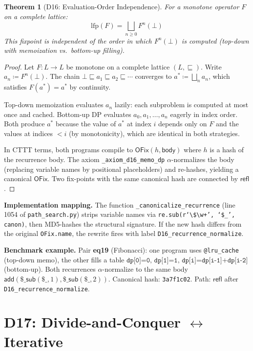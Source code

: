 \documentclass[11pt,a4paper]{report}
\theoremstyle{definition}
\theoremstyle{plain}
\newtheorem{theorem}[definition]{Theorem}
\begin{document}
\begin{theorem}[D16: Evaluation-Order Independence]
\label{thm:d16-lfp}
For a monotone operator $F$ on a complete lattice:
\[
  \mathrm{lfp}(F) = \bigsqcup_{n \geq 0} F^n(\bot)
\]
This fixpoint is independent of the order in which $F^n(\bot)$ is
computed (top-down with memoization vs.\ bottom-up filling).
\end{theorem}

\begin{proof}
Let $F : L \to L$ be monotone on a complete lattice $(L, \sqsubseteq)$.
Write $a_n \coloneqq F^n(\bot)$.  The chain
$\bot \sqsubseteq a_1 \sqsubseteq a_2 \sqsubseteq \cdots$ converges
to $a^* \coloneqq \bigsqcup_n a_n$, which satisfies $F(a^*) = a^*$
by continuity.

Top-down memoization evaluates $a_n$ lazily: each subproblem is
computed at most once and cached.  Bottom-up DP evaluates $a_0, a_1,
\ldots, a_n$ eagerly in index order.  Both produce $a^*$ because the
value of $a^*$ at index $i$ depends only on $F$ and the values at
indices $< i$ (by monotonicity), which are identical in both strategies.

In CTTT terms, both programs compile to $\mathsf{OFix}(h, \mathsf{body})$
where $h$ is a hash of the recurrence body.  The axiom
\texttt{\_axiom\_d16\_memo\_dp} $\alpha$-normalizes the body (replacing
variable names by positional placeholders) and re-hashes, yielding a
canonical $\mathsf{OFix}$.  Two fix-points with the same canonical
hash are connected by $\mathsf{refl}$.
\end{proof}

\textbf{Implementation mapping.}
The function \texttt{\_canonicalize\_recurrence} (line 1054 of
\texttt{path\_search.py}) strips variable names via
\texttt{re.sub(r`\textbackslash\$\textbackslash w+', `\$\_', canon)},
then MD5-hashes the structural signature.  If the new hash differs
from the original \texttt{OFix.name}, the rewrite fires with label
\texttt{D16\_recurrence\_normalize}.

\textbf{Benchmark example.}
Pair \textbf{eq19} (Fibonacci): one program uses
\texttt{@lru\_cache} (top-down memo), the other fills a table
$\texttt{dp[0]=0, dp[1]=1, dp[i]=dp[i-1]+dp[i-2]}$ (bottom-up).
Both recurrences $\alpha$-normalize to the same body
$\mathsf{add}(\$\_\mathsf{sub}(\$\_,1), \$\_\mathsf{sub}(\$\_,2))$.
Canonical hash: \texttt{3a7f1c02}.  Path: $\mathsf{refl}$ after
\texttt{D16\_recurrence\_normalize}.

\section{D17: Divide-and-Conquer $\leftrightarrow$ Iterative}
\label{sec:d17-assoc}
\end{document}
